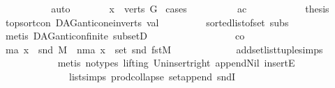 \begin{isabellebody}
\ \ \ \ \ \ \isamarkupfalse%
\ {}\ \isamarkupfalse%
\ auto\isanewline
\ \ \ \ \isamarkupfalse%
\ \isamarkupfalse%
\ {\isachardoublequoteopen}x\ {\isasymin}\ verts\ G{\isachardoublequoteclose}\ \isamarkupfalse%
{\isacharparenleft}{\kern0pt}cases{\isacharparenright}{\kern0pt}\isanewline
\ \ \ \ \ \ \ \ \isamarkupfalse%
\ ac\isanewline
\ \ \ \ \ \ \ \ \isamarkupfalse%
\ \isamarkupfalse%
\ {\isacharquery}{\kern0pt}thesis\ \isamarkupfalse%
\ top{\isacharunderscore}{\kern0pt}sort{\isacharunderscore}{\kern0pt}con\ DAG{\isachardot}{\kern0pt}anticone{\isacharunderscore}{\kern0pt}in{\isacharunderscore}{\kern0pt}verts\ val\ \isanewline
\ \ \ \ \ \ \ \ sorted{\isacharunderscore}{\kern0pt}list{\isacharunderscore}{\kern0pt}of{\isacharunderscore}{\kern0pt}set{\isacharparenleft}{\kern0pt}{}{\isacharparenright}{\kern0pt}\ subs\isanewline
\ \ \ \ \ \ \ \ \ \ \isamarkupfalse%
\ {\isacharparenleft}{\kern0pt}metis\ DAG{\isachardot}{\kern0pt}anticon{\isacharunderscore}{\kern0pt}finite\ subsetD{\isacharparenright}{\kern0pt}\ \isanewline
\ \ \ \ \ \ \isamarkupfalse%
\isanewline
\ \ \ \ \ \ \ \ \isamarkupfalse%
\ co\isanewline
\ \ \ \ \ \ \ \ \isamarkupfalse%
\ \isamarkupfalse%
\ {\isacharparenleft}{\kern0pt}ma{\isacharparenright}{\kern0pt}\ {\isachardoublequoteopen}x\ {\isacharequal}{\kern0pt}\ snd\ M{\isachardoublequoteclose}\ {\isacharbar}{\kern0pt}\ {\isacharparenleft}{\kern0pt}nma{\isacharparenright}{\kern0pt}\ {\isachardoublequoteopen}x\ {\isasymin}\ set\ {\isacharparenleft}{\kern0pt}snd{\isacharparenleft}{\kern0pt}\ fst{\isacharparenleft}{\kern0pt}M{\isacharparenright}{\kern0pt}{\isacharparenright}{\kern0pt}{\isacharparenright}{\kern0pt}{\isachardoublequoteclose}\ \isanewline
\ \ \ \ \ \ \ \ \ \ \isamarkupfalse%
\ add{\isacharunderscore}{\kern0pt}set{\isacharunderscore}{\kern0pt}list{\isacharunderscore}{\kern0pt}tuple{\isachardot}{\kern0pt}simps\isanewline
\ \ \ \ \ \ \ \ \ \ \isamarkupfalse%
\ {\isacharparenleft}{\kern0pt}metis\ {\isacharparenleft}{\kern0pt}no{\isacharunderscore}{\kern0pt}types{\isacharcomma}{\kern0pt}\ lifting{\isacharparenright}{\kern0pt}\ Un{\isacharunderscore}{\kern0pt}insert{\isacharunderscore}{\kern0pt}right\ append{\isacharunderscore}{\kern0pt}Nil{}\ insertE\isanewline
\ \ \ \ \ \ \ \ \ \ \ \ \ \ list{\isachardot}{\kern0pt}simps{\isacharparenleft}{\kern0pt}{}{}{\isacharparenright}{\kern0pt}\ prod{\isachardot}{\kern0pt}collapse\ set{\isacharunderscore}{\kern0pt}append\ sndI{\isacharparenright}{\kern0pt}\ \isanewline

\end{isabellebody}
